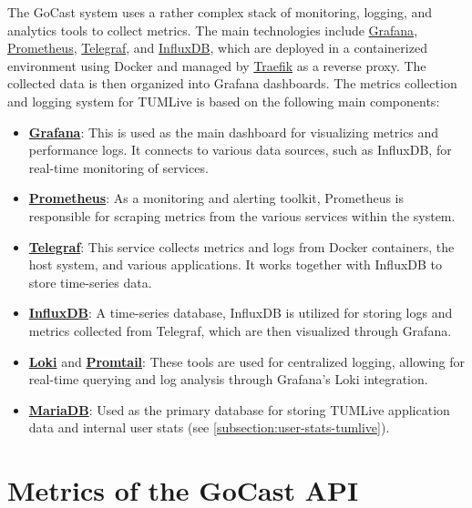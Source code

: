 The GoCast system uses a rather complex stack of monitoring, logging, and analytics tools to collect metrics. The main technologies include \href{https://github.com/grafana/grafana}{Grafana}, \href{https://github.com/prometheus/prometheus}{Prometheus}, \href{https://github.com/influxdata/telegraf}{Telegraf}, and \href{https://github.com/influxdata/influxdb}{InfluxDB}, which are deployed in a containerized environment using Docker and managed by \href{https://github.com/traefik/traefik}{Traefik} as a reverse proxy. The collected data is then organized into Grafana dashboards. The metrics collection and logging system for TUMLive is based on the following main components:
\begin{itemize}
    \item \textbf{\href{https://github.com/grafana/grafana}{Grafana}}: This is used as the main dashboard for visualizing metrics and performance logs. It connects to various data sources, such as InfluxDB, for real-time monitoring of services.
    \item \textbf{\href{https://github.com/prometheus/prometheus}{Prometheus}}: As a monitoring and alerting toolkit, Prometheus is responsible for scraping metrics from the various services within the system.
    \item \textbf{\href{https://github.com/influxdata/telegraf}{Telegraf}}: This service collects metrics and logs from Docker containers, the host system, and various applications. It works together with InfluxDB to store time-series data.
    \item \textbf{\href{https://github.com/influxdata/influxdb}{InfluxDB}}: A time-series database, InfluxDB is utilized for storing logs and metrics collected from Telegraf, which are then visualized through Grafana.
    \item \textbf{\href{https://github.com/grafana/loki}{Loki}} and \textbf{\href{https://grafana.com/docs/loki/latest/send-data/promtail/}{Promtail}}: These tools are used for centralized logging, allowing for real-time querying and log analysis through Grafana's Loki integration.
    \item \textbf{\href{https://mariadb.org/}{MariaDB}}: Used as the primary database for storing TUMLive application data and internal user stats (see \autoref{subsection:user-stats-tumlive}).
\end{itemize}

\section{Metrics of the GoCast API}


